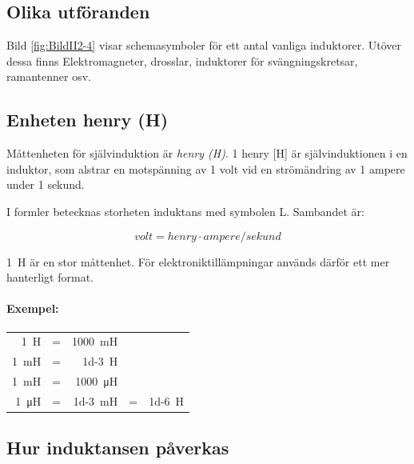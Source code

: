 \subsection{Olika utföranden}

Bild \ref{fig:BildII2-4} visar schemasymboler för ett antal vanliga induktorer.
Utöver dessa finns Elektromagneter, drosslar, induktorer för svängningskretsar,
ramantenner osv.

\subsection{Enheten henry (H)}

Måttenheten för självinduktion är \emph{henry (H)}.
1 henry [H] är självinduktionen i en induktor, som alstrar en motspänning av
1 volt vid en strömändring av 1 ampere under 1 sekund.

I formler betecknas storheten induktans med symbolen L.
Sambandet är:

\[ \unit{volt} = \unit{henry} \cdot \unit{ampere}/\unit{sekund} \]

1~H är en stor måttenhet. För elektroniktillämpningar används därför ett mer
hanterligt format.

\noindent \paragraph{Exempel:}

\begin{tabular}{rcrcr}
	      \SI{1}{\henry} & = & \SI{1000}{\milli\henry} &   &  \\
	\SI{1}{\milli\henry} & = &       \SI{1d-3}{\henry} &   &  \\
	\SI{1}{\milli\henry} & = & \SI{1000}{\micro\henry} &   &  \\
	\SI{1}{\micro\henry} & = & \SI{1d-3}{\milli\henry} & = & \SI{1d-6}{\henry}
\end{tabular}

\subsection{Hur induktansen påverkas}

